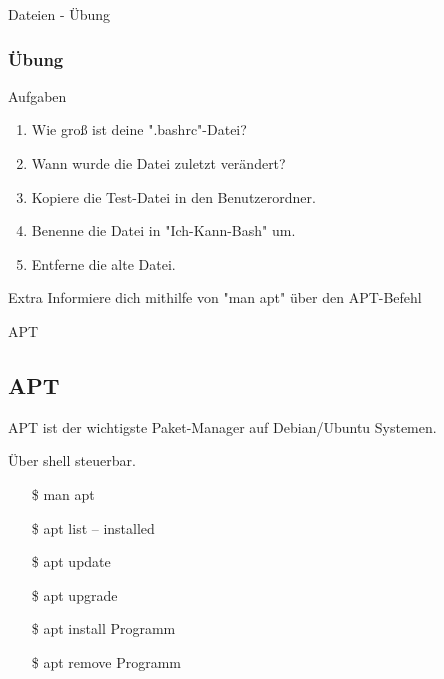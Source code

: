 \begin{frame}{Dateien - Übung}
    \subsubsection{Übung}\label{subsubsec:übung}

    \begin{alertblock}{Aufgaben}
        \begin{enumerate}
            \item Wie groß ist deine ".bashrc"-Datei?\pause
            \item Wann wurde die Datei zuletzt verändert?\pause
            \item Kopiere die Test-Datei in den Benutzerordner.\pause
            \item Benenne die Datei in "Ich-Kann-Bash" um.\pause
            \item Entferne die alte Datei.
        \end{enumerate}
    \end{alertblock}
    \pause

    \vspace{0.5cm}
    \begin{alertblock}{Extra}
        Informiere dich mithilfe von "man apt" über den APT-Befehl
    \end{alertblock}

\end{frame}

\begin{frame}{APT}
    \subsection{APT}\label{subsec:apt}

    APT ist der wichtigste Paket-Manager auf Debian/Ubuntu Systemen.
    \pause

    \textrightarrow Über shell steuerbar.
    \pause

    \begin{itemize}
        \item[\$] man apt\pause
        \item[\$] apt list  -- installed\pause
        \item[\$] apt update\pause
        \item[\$] apt upgrade\pause
        \item[\$] apt install Programm\pause
        \item[\$] apt remove Programm
    \end{itemize}

\end{frame}

